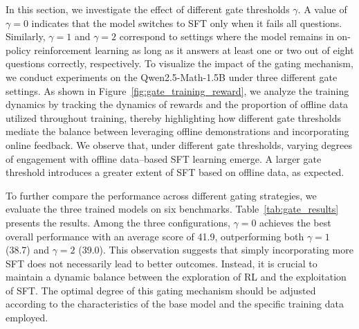 \documentclass{article} %
\newcommand{\0}{\mathbb{0}}
\newcommand{\1}{\mathbb{1}}
\newcommand{\mot}{\textcolor{black}{HPT}\xspace}
\begin{document}
In this section, we investigate the effect of different gate thresholds $\gamma$. A value of $\gamma=0$ indicates that the model switches to SFT only when it fails all questions.
Similarly, $\gamma=1$ and $\gamma=2$ correspond to settings where the model remains in on-policy reinforcement learning as long as it answers at least one or two out of eight questions correctly, respectively.
To visualize the impact of the gating mechanism, we conduct experiments on the Qwen2.5-Math-1.5B under three different gate settings.
As shown in Figure~\ref{fig:gate_training_reward}, we analyze the training dynamics by tracking the dynamics of rewards and the proportion of offline data utilized throughout training, thereby highlighting how different gate thresholds mediate the balance between leveraging offline demonstrations and incorporating online feedback.
We observe that, under different gate thresholds, varying degrees of engagement with offline data–based SFT learning emerge.
A larger gate threshold introduces a greater extent of SFT based on offline data, as expected.

\begin{table}[!ht]
\centering
\caption{Performance of \mot with different switch gate $\gamma$ on Qwen2.5-Math-1.5B.}
\label{tab:gate_results}
\end{table}

To further compare the performance across different gating strategies, we evaluate the three trained models on six benchmarks.
Table~\ref{tab:gate_results} presents the results.
Among the three configurations, $\gamma=0$ achieves the best overall performance with an average score of 41.9, outperforming both $\gamma=1$ (38.7) and $\gamma=2$ (39.0).
This observation suggests that simply incorporating more SFT does not necessarily lead to better outcomes.
Instead, it is crucial to maintain a dynamic balance between the \textcolor{cyan!40!black}{exploration} of RL and the \textcolor{cyan!40!red}{exploitation} of SFT.
The optimal degree of this gating mechanism should be adjusted according to the characteristics of the base model and the specific training data employed.
\end{document}
